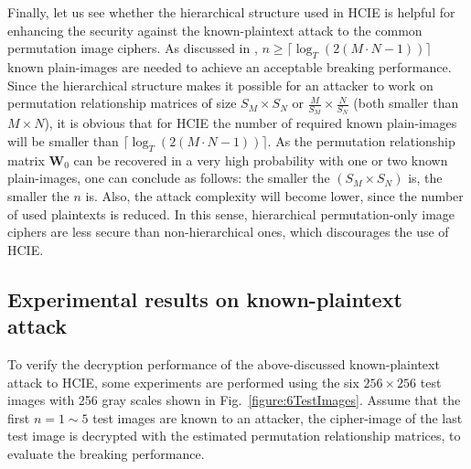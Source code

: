 \documentclass[final,3p,times,twocolumn]{elsarticle}
\begin{document}
Finally, let us see whether the hierarchical structure used in
HCIE is helpful for enhancing the security against the
known-plaintext attack to the common permutation image ciphers. As
discussed in \cite[Sec.~3.1]{Li:Permutation:SPIC2008}, $n\geq\lceil\log_T(2(M\cdot N-1))\rceil$ known
plain-images are needed to achieve an acceptable breaking
performance. Since the hierarchical structure makes it possible
for an attacker to work on permutation relationship matrices of size $S_M\times
S_N$ or $\frac{M}{S_M}\times\frac{N}{S_N}$ (both smaller than
$M\times N$), it is obvious that for HCIE the number of required
known plain-images will be smaller than
$\lceil\log_T(2(M\cdot N-1))\rceil$. As the permutation relationship matrix $\bm{W}_0$
can be recovered in a very high probability with one or two known plain-images, one
can conclude as follows: the smaller the $(S_M\times S_N)$ is, the smaller the $n$ is. Also, the attack complexity will
become lower, since the number of used plaintexts is reduced. In this sense, hierarchical permutation-only image
ciphers are less secure than non-hierarchical ones, which discourages the use of HCIE.

\subsection{Experimental results on known-plaintext attack}
\label{section:Experiments}

To verify the decryption performance of the above-discussed
known-plaintext attack to HCIE, some
experiments are performed using the six $256\times 256$ test
images with 256 gray scales shown in Fig.~\ref{figure:6TestImages}. Assume that the first $n=1\sim 5$ test
images are known to an attacker, the cipher-image of the last test
image is decrypted with the estimated permutation relationship matrices, to evaluate
the breaking performance.
\end{document}
